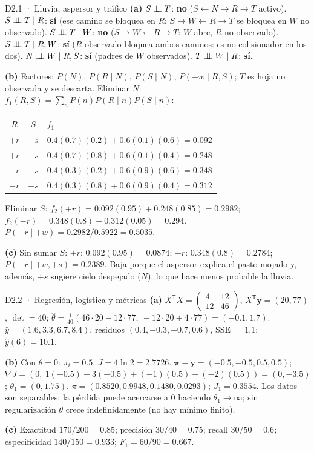 \begin{solucion}{D2.1 · Lluvia, aspersor y tráfico}
\textbf{(a)}
$S\perp\!\!\!\perp T$: \textbf{no} ($S\leftarrow N\to R\to T$ activo).
$S\perp\!\!\!\perp T\mid R$: \textbf{sí} (ese camino se bloquea en $R$; $S\to W\leftarrow R\to T$ se bloquea en $W$ no observado).
$S\perp\!\!\!\perp T\mid W$: \textbf{no} ($S\to W\leftarrow R\to T$: $W$ abre, $R$ no observado).
$S\perp\!\!\!\perp T\mid R,W$: \textbf{sí} ($R$ observado bloquea ambos caminos: es no colisionador en los dos).
$N\perp\!\!\!\perp W\mid R,S$: \textbf{sí} (padres de $W$ observados). $T\perp\!\!\!\perp W\mid R$: \textbf{sí}.

\textbf{(b)} Factores: $P(N)$, $P(R\mid N)$, $P(S\mid N)$, $P(+w\mid R,S)$; $T$ es hoja no observada y se descarta.
Eliminar $N$: $f_1(R,S)=\sum_nP(n)P(R\mid n)P(S\mid n)$:
\begin{center}\small
\begin{tabular}{cc|l}
$R$ & $S$ & $f_1$\\\hline
$+r$ & $+s$ & $0.4(0.7)(0.2)+0.6(0.1)(0.6)=0.092$\\
$+r$ & $-s$ & $0.4(0.7)(0.8)+0.6(0.1)(0.4)=0.248$\\
$-r$ & $+s$ & $0.4(0.3)(0.2)+0.6(0.9)(0.6)=0.348$\\
$-r$ & $-s$ & $0.4(0.3)(0.8)+0.6(0.9)(0.4)=0.312$
\end{tabular}
\end{center}
Eliminar $S$: $f_2(+r)=0.092(0.95)+0.248(0.85)=0.2982$; $f_2(-r)=0.348(0.8)+0.312(0.05)=0.294$.
$P(+r\mid+w)=0.2982/0.5922=\mathbf{0.5035}$.

\textbf{(c)} Sin sumar $S$: $+r$: $0.092(0.95)=0.0874$; $-r$: $0.348(0.8)=0.2784$; $P(+r\mid+w,+s)=\mathbf{0.2389}$. Baja porque el aspersor explica el pasto
mojado y, además, $+s$ sugiere cielo despejado ($N$), lo que hace menos probable la lluvia.
\end{solucion}

\begin{solucion}{D2.2 · Regresión, logística y métricas}
\textbf{(a)} $X^\mathsf TX=\begin{pmatrix}4&12\\12&46\end{pmatrix}$, $X^\mathsf T\mathbf y=(20,77)$, $\det=40$;
$\hat\theta=\frac1{40}(46\cdot20-12\cdot77,\ -12\cdot20+4\cdot77)=(\mathbf{-0.1},\mathbf{1.7})$.
$\hat y=(1.6,3.3,6.7,8.4)$, residuos $(0.4,-0.3,-0.7,0.6)$, SSE $=\mathbf{1.1}$; $\hat y(6)=\mathbf{10.1}$.

\textbf{(b)} Con $\theta=0$: $\pi_i=0.5$, $J=4\ln2=\mathbf{2.7726}$. $\boldsymbol\pi-\mathbf y=(-0.5,-0.5,0.5,0.5)$;
$\nabla J=(0,\ 1(-0.5)+3(-0.5)+(-1)(0.5)+(-2)(0.5))=(0,\mathbf{-3.5})$; $\theta_1=(0,1.75)$.
$\pi=(0.8520,0.9948,0.1480,0.0293)$; $J_1=\mathbf{0.3554}$. Los datos son separables: la pérdida puede acercarse a 0 haciendo $\theta_1\to\infty$; sin regularización
$\theta$ crece indefinidamente (no hay mínimo finito).

\textbf{(c)} Exactitud $170/200=\mathbf{0.85}$; precisión $30/40=\mathbf{0.75}$; recall $30/50=\mathbf{0.6}$; especificidad $140/150=\mathbf{0.933}$; $F_1=60/90=\mathbf{0.667}$.
\end{solucion}

